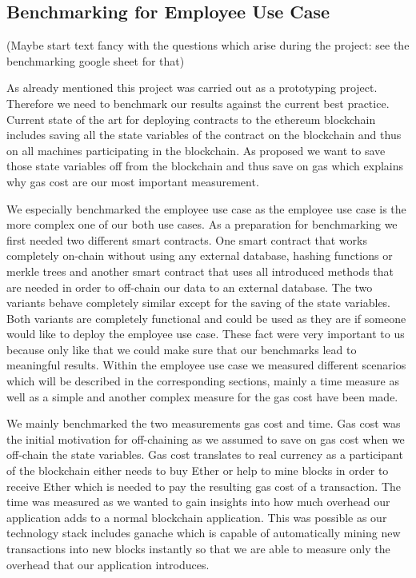\subsection{Benchmarking for Employee Use Case}
(Maybe start text fancy with the questions which arise during the project: see the benchmarking google sheet for that)

As already mentioned this project was carried out as a prototyping project. Therefore we need to benchmark our results against the current best practice. Current state of the art for deploying contracts to the ethereum blockchain includes saving all the state variables of the contract on the blockchain and thus on all machines participating in the blockchain. As proposed we want to save those state variables off from the blockchain and thus save on gas which explains why gas cost are our most important measurement.

We especially benchmarked the employee use case as the employee use case is the more complex one of our both use cases. As a preparation for benchmarking we first needed two different smart contracts. One smart contract that works completely on-chain without using any external database, hashing functions or merkle trees and another smart contract that uses all introduced methods that are needed in order to off-chain our data to an external database. The two variants behave completely similar except for the saving of the state variables. Both variants are completely functional and could be used as they are if someone would like to deploy the employee use case. These fact were very important to us because only like that we could make sure that our benchmarks lead to meaningful results. Within the employee use case we measured different scenarios which will be described in the corresponding sections, mainly a time measure as well as a simple and another complex measure for the gas cost have been made.

We mainly benchmarked the two measurements gas cost and time. Gas cost was the initial motivation for off-chaining as we assumed to save on gas cost when we off-chain the state variables. Gas cost translates to real currency as a participant of the blockchain either needs to buy Ether or help to mine blocks in order to receive Ether which is needed to pay the resulting gas cost of a transaction. The time was measured as we wanted to gain insights into how much overhead our application adds to a normal blockchain application. This was possible as our technology stack includes ganache which is capable of automatically mining new transactions into new blocks instantly so that we are able to measure only the overhead that our application introduces.

